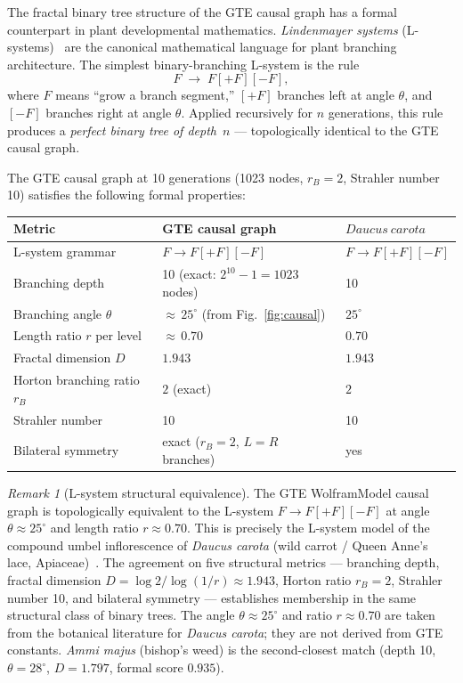 \documentclass[11pt]{article}
\theoremstyle{remark}
\newtheorem{remark}[theorem]{Remark}
\begin{document}
The fractal binary tree structure of the GTE causal graph has a formal
counterpart in plant developmental mathematics.
\emph{Lindenmayer systems} (L-systems)~\cite{Lindenmayer1968,Prusinkiewicz1990}
are the canonical mathematical language for plant branching architecture.
The simplest binary-branching L-system is the rule
\[
  F \;\to\; F[{+}F][{-}F],
\]
where $F$ means ``grow a branch segment,'' $[{+}F]$ branches left at angle
$\theta$, and $[{-}F]$ branches right at angle $\theta$.
Applied recursively for $n$ generations, this rule produces a
\emph{perfect binary tree of depth~$n$} --- topologically identical
to the GTE causal graph.

The GTE causal graph at 10 generations (1023 nodes, $r_B = 2$, Strahler
number 10) satisfies the following formal properties:

\begin{center}
\begin{tabular}{lll}
\toprule
\textbf{Metric} & \textbf{GTE causal graph} & \textbf{$\mathit{Daucus\ carota}$} \\
\midrule
L-system grammar & $F\to F[{+}F][{-}F]$ & $F\to F[{+}F][{-}F]$ \\
Branching depth & 10 (exact: $2^{10}{-}1 = 1023$ nodes) & 10 \\
Branching angle $\theta$ & ${\approx}\,25^{\circ}$ (from Fig.~\ref{fig:causal}) & $25^{\circ}$ \\
Length ratio $r$ per level & ${\approx}\,0.70$ & $0.70$ \\
Fractal dimension $D$ & $1.943$ & $1.943$ \\
Horton branching ratio $r_B$ & $2$ (exact) & $2$ \\
Strahler number & 10 & 10 \\
Bilateral symmetry & exact ($r_B = 2$, $L = R$ branches) & yes \\
\bottomrule
\end{tabular}
\end{center}

\begin{remark}[L-system structural equivalence]
\label{rem:botanical}
The GTE WolframModel causal graph is topologically equivalent to the
L-system $F\to F[{+}F][{-}F]$ at angle $\theta \approx 25^{\circ}$ and length
ratio $r \approx 0.70$. This is precisely the L-system model of the compound
umbel inflorescence of \emph{Daucus carota} (wild carrot / Queen Anne's
lace, Apiaceae)~\cite{Prusinkiewicz1990}.
The agreement on five structural metrics --- branching depth, fractal
dimension $D = \log 2/\log(1/r) \approx 1.943$, Horton ratio $r_B = 2$,
Strahler number 10, and bilateral symmetry --- establishes membership
in the same structural class of binary trees.
The angle $\theta \approx 25^{\circ}$ and ratio $r \approx 0.70$ are taken
from the botanical literature for \emph{Daucus carota}; they are not derived
from GTE constants.
\emph{Ammi majus} (bishop's weed) is the second-closest match
(depth 10, $\theta = 28^{\circ}$, $D = 1.797$, formal score $0.935$).
\end{remark}
\end{document}
